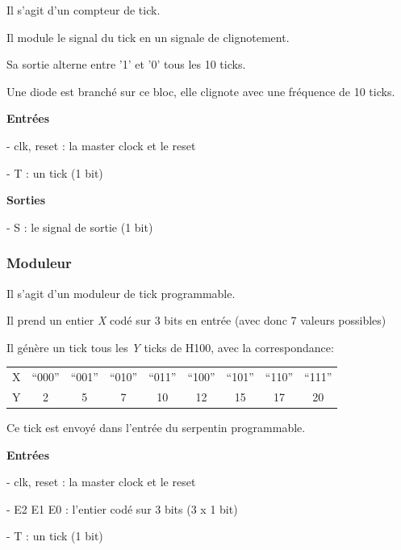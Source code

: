 \documentclass[10pt]{article}
\begin{document}
        Il s'agit d'un compteur de tick.
                
        Il module le signal du tick en un signale de clignotement.
        
        Sa sortie alterne entre '1' et '0' tous les 10 ticks.
        
        Une diode est branché sur ce bloc, elle clignote avec une fréquence de 10 ticks.
                
        \textbf{Entrées}
        
            - clk, reset : la master clock et le reset
            
            - T : un tick (1 bit)
                            
        \textbf{Sorties}
            
            - S : le signal de sortie (1 bit)
        
        \subsubsection{Moduleur}
        
        Il s'agit d'un moduleur de tick programmable.
                
        Il prend un entier \textit{X} codé sur 3 bits en entrée (avec donc 7 valeurs possibles)
        
        Il génère un tick tous les \textit{Y} ticks de H100, avec la correspondance:
        
        \begin{table}[h]
            \centering
            \begin{tabular}{ccccccccc}
                   X & ``000'' & ``001'' & ``010'' & ``011'' & ``100'' & ``101'' & ``110'' & ``111'' \\
                   Y &    2    &    5    &    7    &    10   &    12   &   15    &   17    &    20   \\
            \end{tabular}
        \end{table}
        
        Ce tick est envoyé dans l'entrée du serpentin programmable.

        \textbf{Entrées}
        
            - clk, reset : la master clock et le reset

            - E2 E1 E0 : l'entier codé sur 3 bits (3 x 1 bit)

            - T : un tick (1 bit)
                            
\end{document}
